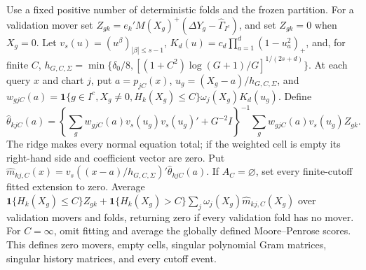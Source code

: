 Use a fixed positive number of deterministic folds and the frozen partition. For a validation mover set \(Z_{gk}=e_k'M(X_g)^+(\Delta Y_g-\widehat\Gamma_{I^c})\), and set \(Z_{gk}=0\) when \(X_g=0\). Let \(v_s(u)=(u^\beta)_{|\beta|\le s-1}\), \(K_d(u)=c_d\prod_{a=1}^d(1-u_a^2)_+\), and, for finite \(C\), \(h_{G,C,\Sigma}=\min\{\delta_0/8,[(1+C^2)\log(G+1)/G]^{1/(2s+d)}\}\). At each query \(x\) and chart \(j\), put \(a=p_{jC}(x)\), \(u_g=(X_g-a)/h_{G,C,\Sigma}\), and \(w_{gjC}(a)=\mathbf 1\{g\in I^c,X_g\ne0,H_k(X_g)\le C\}\omega_j(X_g)K_d(u_g)\). Define \[\widehat\theta_{kjC}(a)=\left\{\sum_gw_{gjC}(a)v_s(u_g)v_s(u_g)'+G^{-2}I\right\}^{-1}\sum_gw_{gjC}(a)v_s(u_g)Z_{gk}.\] The ridge makes every normal equation total; if the weighted cell is empty its right-hand side and coefficient vector are zero. Put \(\widehat m_{kj,C}(x)=v_s((x-a)/h_{G,C,\Sigma})'\widehat\theta_{kjC}(a)\). If \(A_C=\varnothing\), set every finite-cutoff fitted extension to zero. Average \(\mathbf 1\{H_k(X_g)\le C\}Z_{gk}+\mathbf 1\{H_k(X_g)>C\}\sum_j\omega_j(X_g)\widehat m_{kj,C}(X_g)\) over validation movers and folds, returning zero if every validation fold has no mover. For \(C=\infty\), omit fitting and average the globally defined Moore--Penrose scores. This defines zero movers, empty cells, singular polynomial Gram matrices, singular history matrices, and every cutoff event.